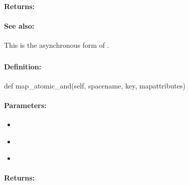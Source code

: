 \paragraph{Returns:}


\paragraph{See also:}  This is the asynchronous form of .

\pagebreak
\subsubsection{}
\label{api:python:map_atomic_and}


\paragraph{Definition:}
\begin{pythoncode}
def map_atomic_and(self, spacename, key, mapattributes)
\end{pythoncode}

\paragraph{Parameters:}
\begin{itemize}[noitemsep]
\item {}\\

\item {}\\

\item {}\\

\end{itemize}

\paragraph{Returns:}


\pagebreak
\subsubsection{}
\label{api:python:async_map_atomic_and}


